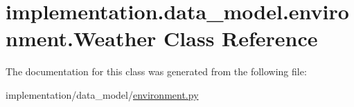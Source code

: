 \hypertarget{classimplementation_1_1data__model_1_1environment_1_1_weather}{}\section{implementation.\+data\+\_\+model.\+environment.\+Weather Class Reference}
\label{classimplementation_1_1data__model_1_1environment_1_1_weather}


The documentation for this class was generated from the following file\+:\begin{DoxyCompactItemize}
\item 
implementation/data\+\_\+model/\hyperlink{environment_8py}{environment.\+py}\end{DoxyCompactItemize}

